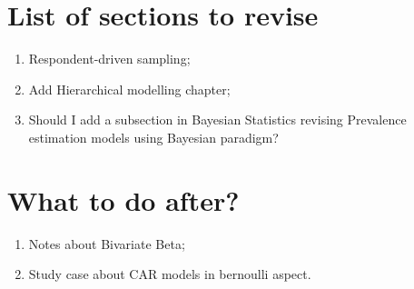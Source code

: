 \listoftodos

\section*{List of sections to revise}

\begin{enumerate}
    \item Respondent-driven sampling; 
    \item Add Hierarchical modelling chapter; 
    \item Should I add a subsection in Bayesian Statistics revising Prevalence
    estimation models using Bayesian paradigm? 
\end{enumerate}

\section*{What to do after?}

\begin{enumerate}
    \item Notes about Bivariate Beta;
    \item Study case about CAR models in bernoulli aspect. 
\end{enumerate}